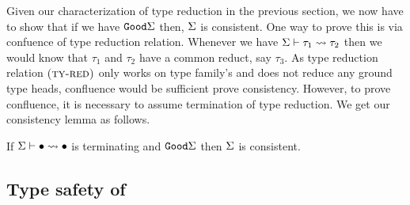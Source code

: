\documentclass[format=sigplan,manuscript,review,screen,nonacm,margin=1in]{acmart}
\begin{document}
Given our characterization of type reduction in the previous section, we now have to show
that if we have $\texttt{Good}\Sigma$ then, $\Sigma$ is consistent. One way to prove this is
via confuence of type reduction relation. Whenever we have $\Sigma \vdash \tau_1 \rightsquigarrow \tau_2$
then we would know that $\tau_1$ and $\tau_2$ have a common reduct, say $\tau_3$. As type reduction
relation $\textsc{(ty-red)}$ only works on type family's and does not reduce any ground type heads,
confluence would be sufficient prove consistency. However, to prove confluence, it is necessary to assume
termination of type reduction. We get our consistency lemma as follows.
\begin{lemma}[Consistency]
  If $\Sigma \vdash \bullet \rightsquigarrow \bullet$ is terminating and $\texttt{Good}\Sigma$ then $\Sigma$ is consistent.
\end{lemma}

\subsection{Type safety of \CLTF{}}\label{subsec:tf-closed-safety}
\newcommand\SApp{
  \ib{\irule[\trule{s-app}]
    {\stepsto {\Tm_1} {\Tm'_1}};
    {\stepsto {\Tm_1\App\Tm_2} {\Tm'_1\App\Tm_2}}}
}
\newcommand\STApp{
  \ib{\irule[\trule{s-tapp}]
    {\stepsto {\Tm_1} {\Tm'_1}};
    {\stepsto {\Tm_1\App\tau} {\Tm'_1\App\tau}}}
}

\newcommand\SCApp{
  \ib{\irule[\trule{s-capp}]
    {\stepsto {\Tm_1} {\Tm'_1}};
    {\stepsto {\Tm_1\App\Co} {\Tm'_1\App\Co}}}
}

\newcommand\SCast{
  \ib{\irule[\trule{s-cast}]
    {\stepsto {\Tm_1} {\Tm'_1}};
    {\stepsto {\cast{\Tm_1}\Co} {\cast{\Tm'_1}\Co}}}
}

\newcommand\SBeta{
  \ib{\irule[\trule{s-$\beta$}];
    {\stepsto {(\Lam x \tau \Tm_1)\App\Tm_2} {\Tm_1[x/\Tm_2]}}
  }
}
\newcommand\STBeta{
  \ib{\irule[\trule{s-T$\beta$}];
    {\stepsto {(\TLam \alpha \Tm)\App\tau} {\Tm[\alpha/\tau]}}
  }
}

\newcommand\SPush{
  \ib{\irule[\trule{s-push}]
    {\Co_1 = \sym{\nth 0 \Co}}
    {\Co_2 = \nth 1 \Co};
    {\stepsto {(\cast {\Lam x \tau \Tm} \Co) \App \Tm_1} {\cast {(\Lam x \tau \Tm)\App(\cast{\Tm_1} {\Co_1})} {\Co_2}}}
  }
}
\newcommand\STPush{
  \ib{\irule[\trule{s-tpush}];
    {\stepsto {(\cast {\TLam \alpha \Tm} \Co) \App \tau} {\cast {(\TLam \alpha \Tm)\App\tau} {\Co@\tau}}}
  }
}
\newcommand\STrans{
  \ib{\irule[\trule{s-trans}];
    {\stepsto {\cast {(\cast \Tm \Co)} \MoreCo} {\cast \Tm {\comp\Co\MoreCo}}}
  }
  
}
\end{document}
